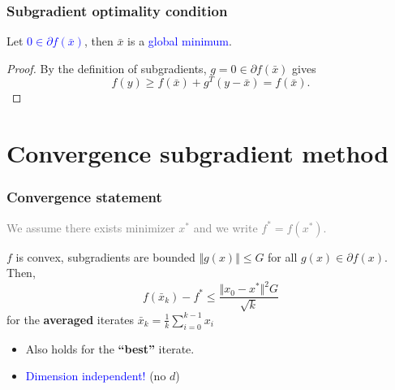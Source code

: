 \documentclass{beamer}
\begin{document}
\begin{frame}
  \frametitle{Subgradient optimality condition}
  \begin{lemma}%
    Let \textcolor{blue}{$0 \in \partial f(\bar{x})$}, then $\bar{x}$ is a \textcolor{blue}{global minimum}.
  \end{lemma}
  \begin{proof}
    By the definition of subgradients, $g=0 \in \partial f(\bar{x})$ gives
    \begin{equation}
      f(y) \ge f(\bar{x}) + g^T(y-\bar{x}) = f(\bar{x}).
    \end{equation}
  \end{proof}
\end{frame}


\section{Convergence subgradient method}%
\label{sec:}

\begin{frame}
  \frametitle{Convergence statement}
  \textcolor{gray}{We assume there exists minimizer $x^*$ and we write $f^*=f(x^*)$.}
  \begin{theorem}
    $f$ is convex, subgradients are bounded $\Vert g(x) \Vert \le G$ for all $g(x)\in \partial f(x)$. Then,
    \begin{equation}
      f(\bar{x}_k) - f^* \le \frac{\Vert x_0-x^*\Vert^2 G}{\sqrt{k}}
    \end{equation}
    for the \textbf{averaged} iterates $\bar{x}_k = \frac{1}{k} \sum_{i=0}^{k-1} x_i $
  \end{theorem}
  \begin{itemize}
    \item Also holds for the \textbf{``best''} iterate.
    \item \textcolor{blue}{Dimension independent!} (no $d$)
  \end{itemize}
\end{frame}
\end{document}
